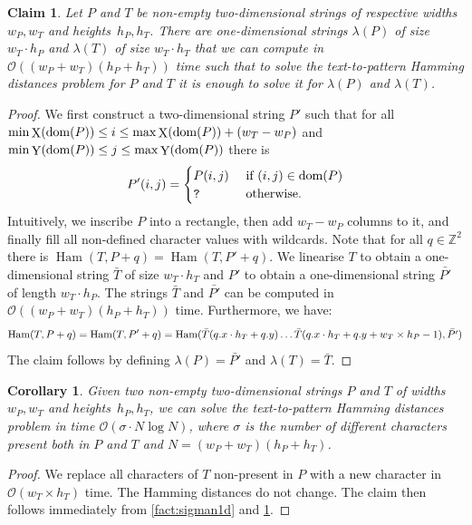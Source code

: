 \documentclass[a4paper,11pt]{article}
\newtheorem{corollary}{Corollary}[section]
\newtheorem{claim}{Claim}[section]
\newcommand{\Z}{\mathbb{Z}}
\renewcommand{\O}{\mathcal{O}}
\DeclareMathOperator*{\X}{X}
\DeclareMathOperator*{\Y}{Y}
\DeclareMathOperator*{\Ham}{Ham}
\begin{document}
\begin{claim}
\label{claim:padding}
Let $P$ and $T$ be non-empty two-dimensional strings of respective widths $w_P, w_T$ and heights~$h_P, h_T$. There are one-dimensional strings $\lambda(P)$ of size $w_T \cdot h_P$ and $\lambda(T)$ of size $w_T \cdot h_T$ that we can compute in $\O((w_P+w_T)(h_P+h_T))$ time such that to solve the text-to-pattern Hamming distances problem for $P$ and $T$ it is enough to solve it for $\lambda(P)$ and $\lambda(T)$. 
\end{claim}
\begin{proof}
We first construct a two-dimensional string $P'$ such that for all $\min \X(\d{P}) \le i \le \max \X(\d{P})+(w_T-w_P)$ and $\min \Y(\d{P}) \le j \le \max \Y(\d{P})$ there is
%
$$
P'(i,j) = 
\begin{cases}
P(i,j) & \text{ if } (i,j) \in \operatorname*{dom}(P)\\
\texttt{?} & \text{ otherwise.}
\end{cases}
$$
%
Intuitively, we inscribe $P$ into a rectangle, then add $w_T-w_P$ columns to it, and finally fill all non-defined character values with wildcards. Note that for all $q \in \Z^2$ there is $\Ham(T,P+q) = \Ham(T,P'+q)$. We linearise $T$ to obtain a one-dimensional string $\bar{T}$ of size $w_T \cdot h_T$ and $P'$ to obtain a one-dimensional string $\bar{P'}$ of length $w_T \cdot h_P$. The strings $\bar{T}$ and $\bar{P'}$ can be computed in $\O((w_P+w_T)(h_P+h_T))$ time. Furthermore, we have:
%
$$\Ham(T, P+q) = \Ham(T,P'+q) = \Ham(\bar{T}(\x{q} \cdot h_T + \y{q}) \ldots \bar{T}(\x{q} \cdot h_T + \y{q}+w_T \times h_P-1), \bar{P'})$$
%
The claim follows by defining $\lambda(P) = \bar{P'}$ and $\lambda(T) = \bar{T}$.  
\end{proof}

\begin{corollary}\label{cor:sigman2d}
Given two non-empty two-dimensional strings $P$ and $T$ of widths $w_P, w_T$ and heights~$h_P, h_T$, we can solve the text-to-pattern Hamming distances problem in time $\O(\sigma \cdot N \log N)$, where $\sigma$ is the number of different characters present both in $P$ and $T$ and $N = (w_P + w_T)(h_P + h_T)$.
\end{corollary}
\begin{proof}
We replace all characters of $T$ non-present in $P$ with a new character in $\O(w_T\times h_T)$ time. The Hamming distances do not change. The claim then follows immediately from \cref{fact:sigman1d} and \cref{claim:padding}. 
\end{proof}
\end{document}
